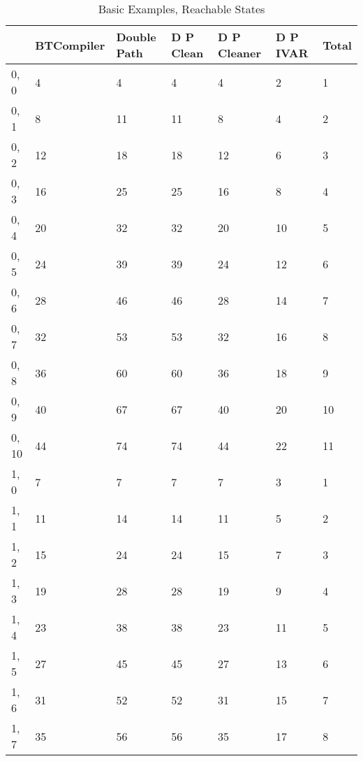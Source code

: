 \begin{table}
\centering
\caption{Basic Examples, Reachable States}
\label{b_e_reach}
\begin{tabular}{lllllll}
\toprule
{} & BTCompiler & Double Path & D P Clean & D P Cleaner & D P IVAR & Total \\
\midrule
0, 0   &          4 &           4 &         4 &           4 &        2 &     1 \\
0, 1   &          8 &          11 &        11 &           8 &        4 &     2 \\
0, 2   &         12 &          18 &        18 &          12 &        6 &     3 \\
0, 3   &         16 &          25 &        25 &          16 &        8 &     4 \\
0, 4   &         20 &          32 &        32 &          20 &       10 &     5 \\
0, 5   &         24 &          39 &        39 &          24 &       12 &     6 \\
0, 6   &         28 &          46 &        46 &          28 &       14 &     7 \\
0, 7   &         32 &          53 &        53 &          32 &       16 &     8 \\
0, 8   &         36 &          60 &        60 &          36 &       18 &     9 \\
0, 9   &         40 &          67 &        67 &          40 &       20 &    10 \\
0, 10  &         44 &          74 &        74 &          44 &       22 &    11 \\
1, 0   &          7 &           7 &         7 &           7 &        3 &     1 \\
1, 1   &         11 &          14 &        14 &          11 &        5 &     2 \\
1, 2   &         15 &          24 &        24 &          15 &        7 &     3 \\
1, 3   &         19 &          28 &        28 &          19 &        9 &     4 \\
1, 4   &         23 &          38 &        38 &          23 &       11 &     5 \\
1, 5   &         27 &          45 &        45 &          27 &       13 &     6 \\
1, 6   &         31 &          52 &        52 &          31 &       15 &     7 \\
1, 7   &         35 &          56 &        56 &          35 &       17 &     8 \\

\end{tabular}
\end{table}
